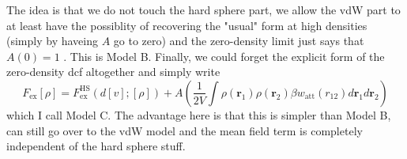\documentclass[aps,preprint]{revtex4-1}%
\begin{document}
The idea is that we do not touch the hard sphere part, we allow the vdW part
to at least have the possiblity of recovering the "usual" form at high
densities (simply by haveing $A$ go to zero) and  the zero-density limit just
says that $A(0)=1$ . This is Model B. Finally, we could forget the explicit
form of the zero-density dcf altogether and simply write
\begin{equation}
F_{\text{ex}}\left[  \rho\right]  =F_{\text{ex}}^{\text{HS}}\left(  d\left[
v\right]  ;\left[  \rho\right]  \right)  +A\left(  \frac{1}{2V}\int\rho\left(
\mathbf{r}_{1}\right)  \rho\left(  \mathbf{r}_{2}\right)  \beta w_{\text{att}%
}\left(  r_{12}\right)  d\mathbf{r}_{1}d\mathbf{r}_{2}\right)
\end{equation}
which I call Model C. The advantage here is that this is simpler than Model B,
can still go over to the vdW model and the mean field term is completely
independent of the hard sphere stuff. 
\end{document}
